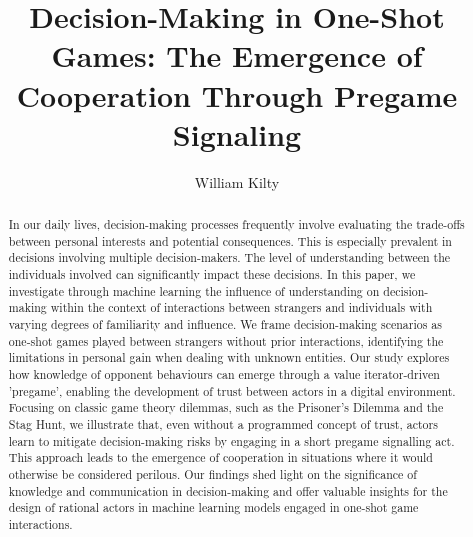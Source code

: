 \documentclass[11pt
              , a4paper
              , twoside
              , openright
              ]{report}
\title{Decision-Making in One-Shot Games: The Emergence of Cooperation Through Pregame Signaling}
\author{William Kilty}
\begin{document}
\frontmatter



\begin{abstract}

  In our daily lives, decision-making processes frequently involve evaluating the trade-offs between personal interests and potential consequences. This is especially prevalent in decisions involving multiple decision-makers. The level of understanding between the individuals involved can significantly impact these decisions. In this paper, we investigate through machine learning the influence of understanding on decision-making within the context of interactions between strangers and individuals with varying degrees of familiarity and influence. We frame decision-making scenarios as one-shot games played between strangers without prior interactions, identifying the limitations in personal gain when dealing with unknown entities. Our study explores how knowledge of opponent behaviours can emerge through a value iterator-driven 'pregame', enabling the development of trust between actors in a digital environment. Focusing on classic game theory dilemmas, such as the Prisoner's Dilemma and the Stag Hunt, we illustrate that, even without a programmed concept of trust, actors learn to mitigate decision-making risks by engaging in a short pregame signalling act. This approach leads to the emergence of cooperation in situations where it would otherwise be considered perilous. Our findings shed light on the significance of knowledge and communication in decision-making and offer valuable insights for the design of rational actors in machine learning models engaged in one-shot game interactions.

\end{abstract}


\maketitle



\tableofcontents



\mainmatter












\backmatter



%


\end{document}
